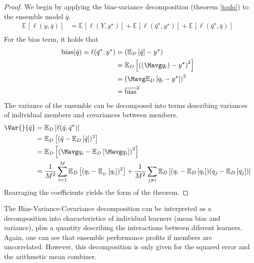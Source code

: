 \documentclass[../main.tex]{subfiles}
\begin{document}
\begin{proof}
We begin by applying the bias-variance decomposition (theorem  \ref{todo}) to the ensemble model $\bar{q}$.
\begin{align*}
\mathbb{E}_{}\left[ \ell(y, \bar{q})  \right]  
&= \mathbb{E}_{}\left[ \ell(Y, y^\star) \right]  + \mathbb{E}_{}\left[ \ell(\bar{q}^\star, y^\star) \right] + \mathbb{E}_{}\left[ \ell(\bar{q}^\star, \bar{q}) \right]  \\
\end{align*}
For the bias term, it holds that
\begin{align*}
\text{bias} (\bar{q}) = 
\ell(\bar{q}^\star, y^\star)
&=  (\mathbb{E}_{D}\left[ \bar{q} \right]  - y^\star)  \\
&=  \mathbb{E}_{D}\left[ \left(\left(\Mavg q_{i}\right) - y^\star\right)^2 \right]   \\
&=  \left(\Mavg \mathbb{E}_{D}\left[ q_{i} - y^\star \right] \right)^2   \\
&=  \overline{\text{bias} }^2   
\end{align*}
The variance of the ensemble can be decomposed into terms describing variances of individual members and covariances between members.
\begin{align*}
\Var{}{\bar{q}} 
&= \mathbb{E}_{D}\left[ \ell(\bar{q}, \bar{q}^\star) \right] \\
&= \mathbb{E}_{D}\left[ (\bar{q} - \mathbb{E}_{D}\left[ \bar{q} \right] )^2 \right]  \\
&= \mathbb{E}_{D}\left[ \left(  \Mavg q_{i} - \mathbb{E}_{D}\left[ \Mavg q_{i} \right]  \right)^2 \right] \\
&= \frac{1}{M^2} \sum_{i=1}^M \mathbb{E}_{D}\left[ (q_{i} - \mathbb{E}_{_{D}}\left[ q_{i} \right] )^2 \right] 
+ \frac{1}{M^2} \sum_{j \not=i} \mathbb{E}_{D}\left[ (q_{i} - \mathbb{E}_{D}\left[ q_{i} \right] ) (q_{j} - \mathbb{E}_{D}\left[ q_{j} \right] ) \right] 
\end{align*}
Rearraging the coefficients yields the form of the theorem.
\end{proof}
The Bias-Variance-Covariance decomposition can be interpreted as a decomposition into characteristics of individual learners (mean bias and variance), plus a quantity describing the interactions between diferent learners. Again, one can see that ensemble performance profits if members are uncorrelated.
However, this decomposition is only given for the squared error and the arithmetic mean combiner. 
\end{document}
